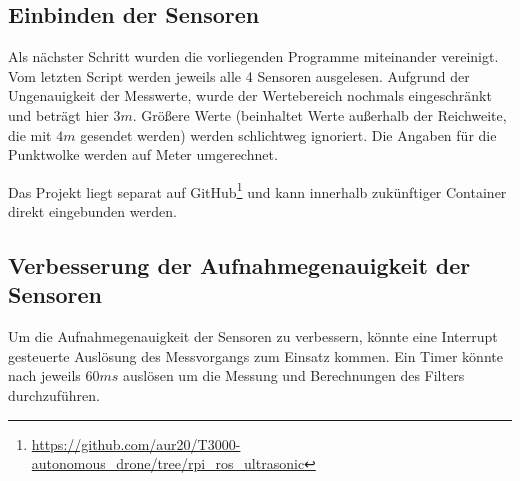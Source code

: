 \subsection{Einbinden der Sensoren}
Als nächster Schritt wurden die vorliegenden Programme miteinander vereinigt.
Vom letzten Script werden jeweils alle 4 Sensoren ausgelesen. Aufgrund der Ungenauigkeit der Messwerte, wurde der Wertebereich nochmals eingeschränkt und beträgt hier $3m$. Größere Werte (beinhaltet Werte außerhalb der Reichweite, die mit $4m$ gesendet werden) werden schlichtweg ignoriert. Die Angaben für die Punktwolke werden auf Meter umgerechnet.

Das Projekt liegt separat auf GitHub\footnote{\url{https://github.com/aur20/T3000-autonomous_drone/tree/rpi_ros_ultrasonic}} und kann innerhalb zukünftiger Container direkt eingebunden werden.

\subsection{Verbesserung der Aufnahmegenauigkeit der Sensoren}
Um die Aufnahmegenauigkeit der Sensoren zu verbessern, könnte eine Interrupt gesteuerte Auslösung des Messvorgangs zum Einsatz kommen. Ein Timer könnte nach jeweils $60ms$ auslösen um die Messung und Berechnungen des Filters durchzuführen.

